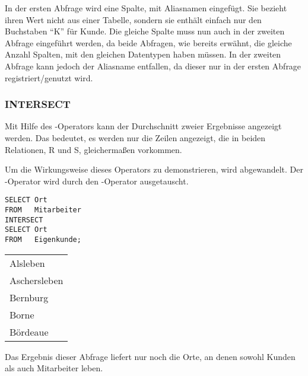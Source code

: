 In der ersten Abfrage wird eine Spalte, mit Aliasnamen  eingefügt. Sie bezieht ihren Wert nicht aus einer Tabelle, sondern sie enthält einfach nur den Buchstaben \enquote{K} für Kunde. Die gleiche Spalte muss nun auch in der zweiten Abfrage eingeführt werden, da beide Abfragen, wie bereits erwähnt, die gleiche Anzahl Spalten, mit den gleichen Datentypen haben müssen. In der zweiten Abfrage kann jedoch der Aliasname entfallen, da dieser nur in der ersten Abfrage registriert/genutzt wird.
\subsubsection{INTERSECT}
Mit Hilfe des -Operators kann der Durchschnitt zweier Ergebnisse angezeigt werden. Das bedeutet, es werden nur die Zeilen angezeigt, die in beiden Relationen, R und S, gleichermaßen vorkommen.

Um die Wirkungsweise dieses Operators zu demonstrieren, wird  abgewandelt. Der -Operator wird durch den -Operator ausgetauscht.


\begin{lstlisting}[language=oracle_sql,caption={Orte, an denen sowohl Kunden als auch Mitarbeiter leben},label=sql04_25]
SELECT Ort
FROM   Mitarbeiter
INTERSECT
SELECT Ort
FROM   Eigenkunde;
          \end{lstlisting}
\begin{center}
    \begin{small}
        \tablehead{}
        \begin{msoraclesql}
            \begin{supertabular}{l}
                Alsleben \\
                Aschersleben \\
                Bernburg \\
                Borne \\
                Bördeaue \\
            \end{supertabular}
        \end{msoraclesql}
    \end{small}
\end{center}
Das Ergebnis dieser Abfrage liefert nur noch die Orte, an denen sowohl Kunden als auch Mitarbeiter leben.
